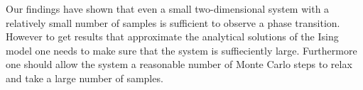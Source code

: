 Our findings have shown that even a small two-dimensional system with a relatively small number of samples is sufficient to observe a phase transition. However to get results that approximate the analytical solutions of the Ising model one needs to make sure that the system is suffieciently large. Furthermore one should allow the system a reasonable number of Monte Carlo steps to relax and take a large number of samples. 
